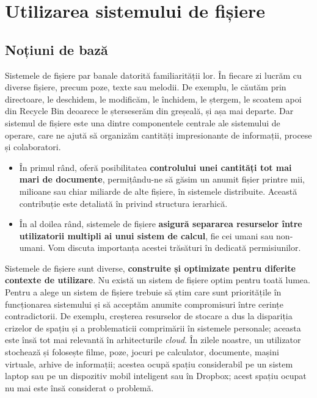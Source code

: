 \chapter{Utilizarea sistemului de fișiere}
\label{chapter:file-system}

\section{Noțiuni de bază}
\label{sec:file-system-baza}

Sistemele de fișiere par banale datorită familiarității lor. În fiecare zi
lucrăm cu diverse fișiere, precum poze, texte sau melodii. De exemplu, le
căutăm prin directoare, le deschidem, le modificăm, le închidem, le ștergem, le
scoatem apoi din Recycle Bin deoarece le șterseserăm din greșeală, și așa mai
departe. Dar sistemul de fișiere este una dintre componentele centrale ale
sistemului de operare, care ne ajută să organizăm cantități
impresionante de informații, procese și colaboratori.

\begin{itemize}
	\item În primul rând, oferă posibilitatea \textbf{controlului unei
		cantități tot mai mari de documente}, permițându-ne să găsim un
		anumit fișier printre mii, milioane sau chiar miliarde de alte
		fișiere, în sistemele distribuite. Această contribuție este
		detaliată în 
		privind structura ierarhică.
	\item În al doilea rând, sistemele de fișiere \textbf{asigură separarea
		resurselor între utilizatorii multipli ai unui sistem de
		calcul}, fie cei umani sau non-umani. Vom discuta importanța
		acestei trăsături în 
		dedicată permisiunilor.
\end{itemize}

Sistemele de fișiere sunt diverse, \textbf{construite și optimizate pentru
diferite contexte de utilizare}. Nu există un sistem de fișiere
optim pentru toată lumea. Pentru a alege un sistem de fișiere trebuie să știm
care sunt prioritățile în funcționarea sistemului și să acceptăm anumite
compromisuri între cerințe contradictorii. De exemplu, creșterea resurselor de
stocare a dus la dispariția crizelor de spațiu și a problematicii comprimării în
sistemele personale; aceasta este însă tot mai relevantă în arhitecturile
\textit{cloud}. În zilele noastre, un utilizator stochează și folosește filme, poze, jocuri pe calculator, documente, mașini virtuale, arhive de informații; acestea ocupă spațiu considerabil pe un sistem laptop sau pe un dispozitiv mobil inteligent sau în Dropbox; acest spațiu ocupat nu mai este însă considerat o problemă.

